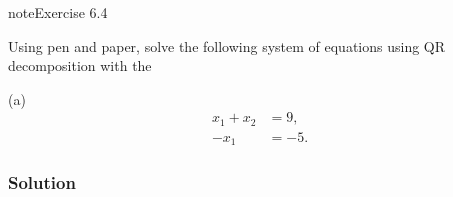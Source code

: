 \documentclass[letterpaper,10pt,english]{jupyterBook}
\begin{document}
\begin{sphinxadmonition}{note}{Exercise 6.4}

\sphinxAtStartPar
Using pen and paper, solve the following system of equations using QR decomposition with the {\hyperref[\detokenize{6_Direct_methods/6.4_QR_decomposition:qr-gramschmidt-definition}]{}}

\sphinxAtStartPar
(a)
\begin{align*}
    x_1 +x_2 &=9,\\
    -x_1 &=-5.
\end{align*}\subsubsection*{Solution}


\end{sphinxadmonition}
\end{document}
